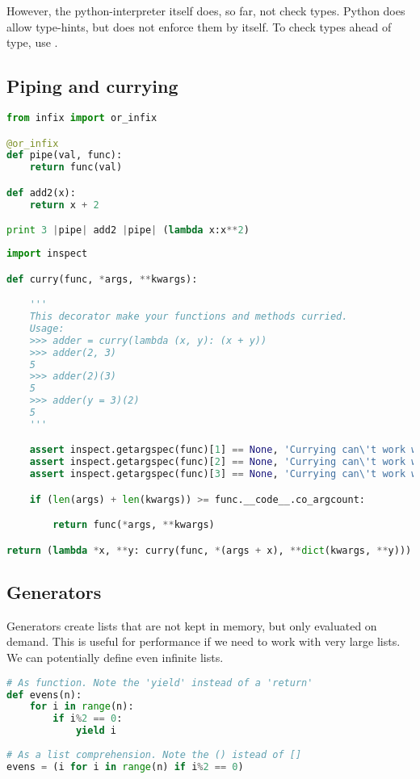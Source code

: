 However, the python-interpreter itself does, so far, not check types. Python does allow type-hints, but does not enforce them by itself. To check types ahead of type, use .

\subsection{Piping and currying}
\begin{lstlisting}[language=python]
from infix import or_infix

@or_infix
def pipe(val, func):
    return func(val)

def add2(x):
    return x + 2

print 3 |pipe| add2 |pipe| (lambda x:x**2)
\end{lstlisting}

\begin{lstlisting}[language=python]
import inspect

def curry(func, *args, **kwargs):

    '''
    This decorator make your functions and methods curried.
    Usage:
    >>> adder = curry(lambda (x, y): (x + y))
    >>> adder(2, 3)
    5
    >>> adder(2)(3)
    5
    >>> adder(y = 3)(2)
    5
    '''

    assert inspect.getargspec(func)[1] == None, 'Currying can\'t work with *args syntax'
    assert inspect.getargspec(func)[2] == None, 'Currying can\'t work with *kwargs syntax'
    assert inspect.getargspec(func)[3] == None, 'Currying can\'t work with default arguments'

    if (len(args) + len(kwargs)) >= func.__code__.co_argcount:

        return func(*args, **kwargs)

return (lambda *x, **y: curry(func, *(args + x), **dict(kwargs, **y)))
\end{lstlisting}

\subsection{Generators}

Generators create lists that are not kept in memory, but only evaluated on demand. This is useful for performance if we need to work with very large lists. We can potentially define even infinite lists. 

\begin{lstlisting}[language=python]
# As function. Note the 'yield' instead of a 'return'
def evens(n):
    for i in range(n):
        if i%2 == 0:
            yield i
            
# As a list comprehension. Note the () istead of []
evens = (i for i in range(n) if i%2 == 0)
\end{lstlisting}


